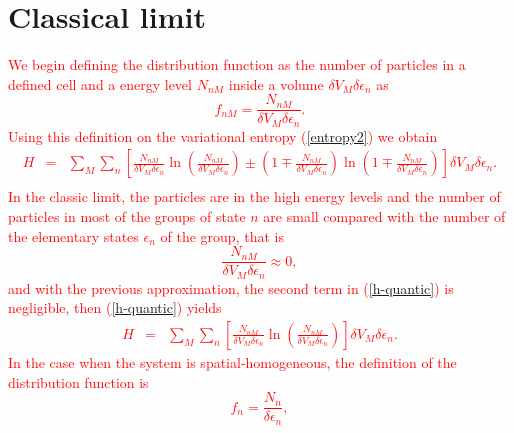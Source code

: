 \documentclass{article}
\newcommand{\de}{\delta}
\begin{document}

\section{Classical limit}
\textcolor{red}{%
We begin defining the distribution function as the number of particles in a defined cell and a energy level $N_{nM}$ inside a volume $\de V_M \delta \epsilon_n$ as
\begin{equation}
    f_{nM}=\frac{N_{nM}}{ \de V_M \delta \epsilon_{n} }.
\end{equation}
Using this definition on the variational entropy (\ref{entropy2}) we obtain
\begin{eqnarray}
    H&=& \sum_M \sum_n
    \left[  
           \frac{N_{nM}}{ \de V_M\delta \epsilon_{n}} \ln 
           \left( 
                  \frac{N_{nM}}{ \de V_M\delta \epsilon_{n}}
           \right)\pm 
           \left(  
                  1\mp \frac{N_{nM}}{ \de V_M \delta \epsilon_{n}}
           \right) \ln 
           \left(  
                   1\mp \frac{N_{nM}}{ \de V_M \delta \epsilon_{n}}
           \right)
    \right] \de V_M \delta \epsilon_{n}. \nonumber \\
    \label{h-quantic} 
\end{eqnarray}
In the classic limit, the particles are in the high energy levels and the number of particles  in most of the groups of state $n$ are small compared with the number of the elementary states $\epsilon_n$ of the group, that is
\begin{equation}
    \frac{N_{nM}}{ \de V_M \delta \epsilon_{n} } \approx 0,
\end{equation}
and with the previous approximation, the second term in (\ref{h-quantic}) is negligible, then (\ref{h-quantic}) yields
\begin{eqnarray}
    H&=& \sum_M \sum_n
    \left[  
           \frac{N_{nM}}{ \de V_M \delta \epsilon_{n}} \ln 
           \left( 
                  \frac{N_{nM}}{ \de V_M \delta \epsilon_{n}}
           \right)
    \right] \de V_M \delta \epsilon_{n}. \label{h-quantic2}
\end{eqnarray}
In the case when the system is spatial-homogeneous, the definition of the distribution function is 
\begin{equation}
    f_{n}=\frac{N_{n}}{ \delta \epsilon_{n} },

\end{equation}}
\end{document}
